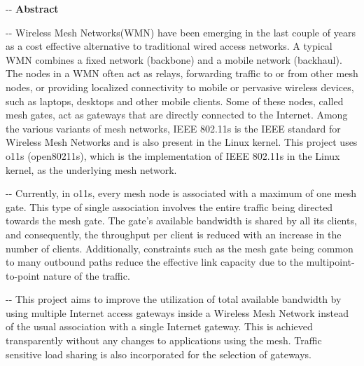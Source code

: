 \documentclass[12pt]{article}
\makeatletter
\newenvironment{indentation}[3]%
	{\par\setlength{\parindent}{#3}
	\setlength{\leftmargin}{#1}       \setlength{\rightmargin}{#1}%
	\advance\linewidth -\leftmargin       \advance\linewidth -\rightmargin%
	\advance\@totalleftmargin\leftmargin  \@setpar{{\@@par}}%
	\parshape 1\@totalleftmargin \linewidth\ignorespaces}{\par}%
\makeatother
\begin{document}
\begin{indentation}{0pt}{0pt}{0pt}
\textbf{{{\Large Abstract}}}
\end{indentation}
\vspace{0.5cm}
\begin{indentation}{0pt}{0pt}{0pt}
{\normalsize \hspace{1cm} Wireless Mesh Networks(WMN) have been emerging in the last couple of years as a cost effective alternative to traditional wired access networks. A typical WMN combines a fixed network (backbone) and a mobile network (backhaul). The nodes in a WMN often act as relays, forwarding traffic to or from other mesh nodes, or providing localized connectivity to mobile or pervasive wireless devices, such as laptops, desktops and other mobile clients. Some of these nodes, called mesh gates, act as gateways that are directly connected to the Internet. Among the various variants of mesh networks, IEEE 802.11s is the IEEE standard for Wireless Mesh Networks and is also present in the Linux kernel. This project uses o11s (open80211s), which is the implementation of IEEE 802.11s in the Linux kernel, as the underlying mesh network.}
\end{indentation}

\begin{indentation}{0pt}{0pt}{0pt}
{\normalsize \hspace{1cm}Currently, in o11s, every mesh node is associated with a maximum of one mesh gate. This type of single association involves the entire traffic being directed towards the mesh gate. The gate's available bandwidth is shared by all its clients, and consequently, the throughput per client is reduced with an increase in the number of clients. Additionally, constraints such as the mesh gate being common to many outbound paths reduce the effective link capacity due to the multipoint-to-point nature of the traffic.}
\end{indentation}
\begin{indentation}{0pt}{0pt}{0pt}
{\normalsize \hspace{1cm}This project aims to improve the utilization of total available bandwidth by using multiple Internet access gateways inside a Wireless Mesh Network instead of the usual association with a single Internet gateway. This is achieved transparently without any changes to applications using the mesh. Traffic sensitive load sharing is also incorporated for the selection of gateways.}
\end{indentation}
\end{document}
